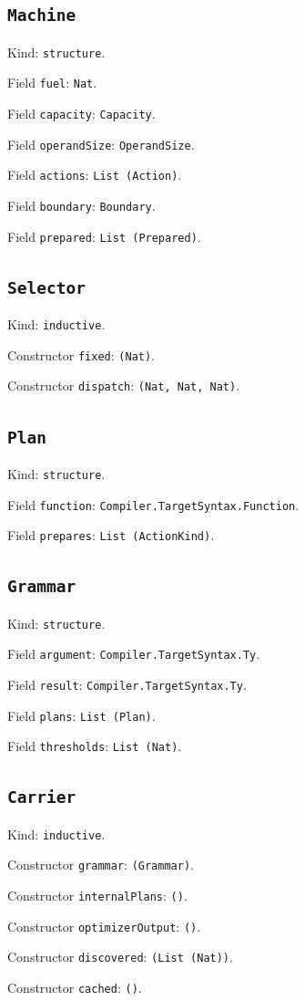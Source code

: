 \documentclass[11pt]{article}
\begin{document}
\subsection*{\texttt{Machine}}
\noindent Kind: \texttt{structure}.\par
\noindent Field \texttt{fuel}: \texttt{Nat}.\par
\noindent Field \texttt{capacity}: \texttt{Capacity}.\par
\noindent Field \texttt{operandSize}: \texttt{OperandSize}.\par
\noindent Field \texttt{actions}: \texttt{List (Action)}.\par
\noindent Field \texttt{boundary}: \texttt{Boundary}.\par
\noindent Field \texttt{prepared}: \texttt{List (Prepared)}.\par
\subsection*{\texttt{Selector}}
\noindent Kind: \texttt{inductive}.\par
\noindent Constructor \texttt{fixed}: \texttt{(Nat)}.\par
\noindent Constructor \texttt{dispatch}: \texttt{(Nat, Nat, Nat)}.\par
\subsection*{\texttt{Plan}}
\noindent Kind: \texttt{structure}.\par
\noindent Field \texttt{function}: \texttt{Compiler.TargetSyntax.Function}.\par
\noindent Field \texttt{prepares}: \texttt{List (ActionKind)}.\par
\subsection*{\texttt{Grammar}}
\noindent Kind: \texttt{structure}.\par
\noindent Field \texttt{argument}: \texttt{Compiler.TargetSyntax.Ty}.\par
\noindent Field \texttt{result}: \texttt{Compiler.TargetSyntax.Ty}.\par
\noindent Field \texttt{plans}: \texttt{List (Plan)}.\par
\noindent Field \texttt{thresholds}: \texttt{List (Nat)}.\par
\subsection*{\texttt{Carrier}}
\noindent Kind: \texttt{inductive}.\par
\noindent Constructor \texttt{grammar}: \texttt{(Grammar)}.\par
\noindent Constructor \texttt{internalPlans}: \texttt{()}.\par
\noindent Constructor \texttt{optimizerOutput}: \texttt{()}.\par
\noindent Constructor \texttt{discovered}: \texttt{(List (Nat))}.\par
\noindent Constructor \texttt{cached}: \texttt{()}.\par
\end{document}
